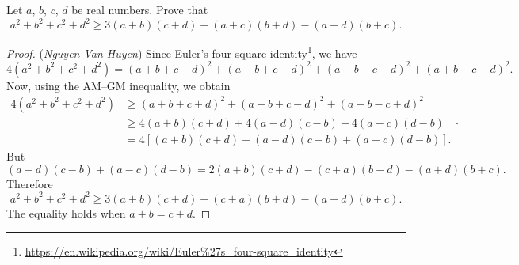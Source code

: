\documentclass[12pt,a4paper]{book}
\begin{document}
\begin{pro_no_count}
Let $a,\,b,\,c,\,d$ be real numbers. Prove that
$$a^2+b^2+c^2+d^2 \geqslant 3(a+b)(c+d)-(a+c)(b+d)-(a+d)(b+c).$$
\end{pro_no_count}

\begin{proof} (\textit{Nguyen Van Huyen})
Since Euler's four-square identity\footnote{\url{https://en.wikipedia.org/wiki/Euler\%27s\_four-square\_identity}}, we have
$$4(a^2+b^2+c^2+d^2) = (a+b+c+d)^2+(a-b+c-d)^2+(a-b-c+d)^2+(a+b-c-d)^2.$$
Now, using the AM–GM inequality, we obtain
$$\begin{aligned}
4(a^2+b^2+c^2+d^2) & \geqslant (a+b+c+d)^2+(a-b+c-d)^2+(a-b-c+d)^2 \\& 
\geqslant 4(a+b)(c+d)+4(a-d)(c-b)+4(a-c)(d-b) \\& = 4[(a+b)(c+d)+(a-d)(c-b)+(a-c)(d-b)].
\end{aligned}.$$
But
$$(a-d)(c-b)+(a-c)(d-b) = 2(a+b)(c+d)-(c+a)(b+d)-(a+d)(b+c).$$
Therefore
$$a^2+b^2+c^2+d^2 \geqslant 3(a+b)(c+d)-(c+a)(b+d)-(a+d)(b+c).$$
The equality holds when $a+b=c+d.$
\end{proof}
\end{document}
